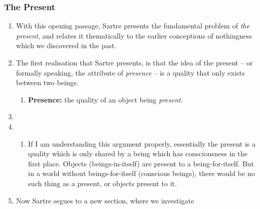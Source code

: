 \subsubsection*{The Present}

\begin{enumerate}
  \item With this opening passage, Sartre presents the fundamental problem of \emph{the present}, and relates it thematically to the earlier conceptions of nothingness which we discovered in the past.
  \item The first realisation that Sartre presents, is that the idea of the present -- or formally speaking, the attribute of \emph{presence} -- is a quality that only exists between two beings.
  \begin{enumerate}
    \item \textbf{Presence:} the quality of an object being \emph{present}.
  \end{enumerate}
  \item {}
  \item {} 
  \begin{enumerate}
    \item If I am understanding this argument properly, essentially the present is a quality which is only shared by a being which has consciousness in the first place. Objects (beings-in-itself) are present to a being-for-itself. But in a world without beings-for-itself (conscious beings), there would be no such thing as a present, or objects present to it.
  \end{enumerate}
  \item Now Sartre segues to a new section, where we investigate 

\end{enumerate}
